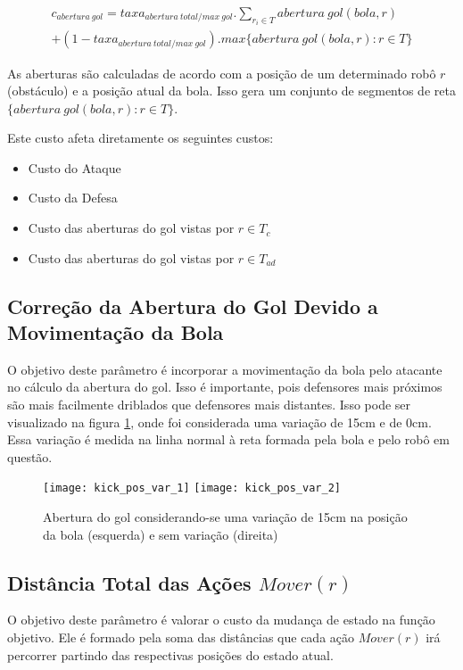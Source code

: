 \begin{multline} 
 c_{abertura{\ }gol} = taxa_{abertura{\ }total/max{\ }gol} .
   \sum_{r_i \in T} abertura{\ }gol(bola, r)\\
   + (1 - taxa_{abertura{\ }total/max{\ }gol}) .
   max \lbrace abertura{\ }gol(bola, r): r \in T \rbrace 
\end{multline}

As aberturas são calculadas de acordo com a posição de um determinado robô $r$ (obstáculo)
e a posição atual da bola. Isso gera um conjunto de segmentos de reta
$\lbrace abertura{\ }gol(bola, r): r \in T \rbrace$.

Este custo afeta diretamente os seguintes custos:
\begin{itemize}
  \item Custo do Ataque
  \item Custo da Defesa
  \item Custo das aberturas do gol vistas por $r\in T_c$
  \item Custo das aberturas do gol vistas por $r\in T_{ad}$
\end{itemize}

\subsection{Correção da Abertura do Gol Devido a Movimentação da Bola} 
O objetivo deste parâmetro é incorporar a movimentação
da bola pelo atacante no cálculo da abertura do gol. Isso é importante,
pois defensores mais
próximos são mais facilmente driblados que defensores mais distantes. Isso
pode ser visualizado na figura \ref{fig:kick_pos}, onde foi considerada
uma variação de 15cm e de 0cm. Essa variação é medida na linha normal
à reta formada pela bola e pelo robô em questão.


\begin{figure}[H]
  \centering
  \texttt{[image: kick\_pos\_var\_1]}
  \texttt{[image: kick\_pos\_var\_2]}
  \caption{Abertura do gol considerando-se uma variação de 15cm na 
           posição da bola (esquerda) e sem variação (direita)}\label{fig:kick_pos}
\end{figure}


\subsection{Distância Total das Ações $Mover(r)$} 
O objetivo deste parâmetro é valorar o custo da
mudança de estado na função objetivo. Ele é formado pela soma das
distâncias que cada ação $Mover(r)$ irá percorrer partindo das
respectivas posições do estado atual.


